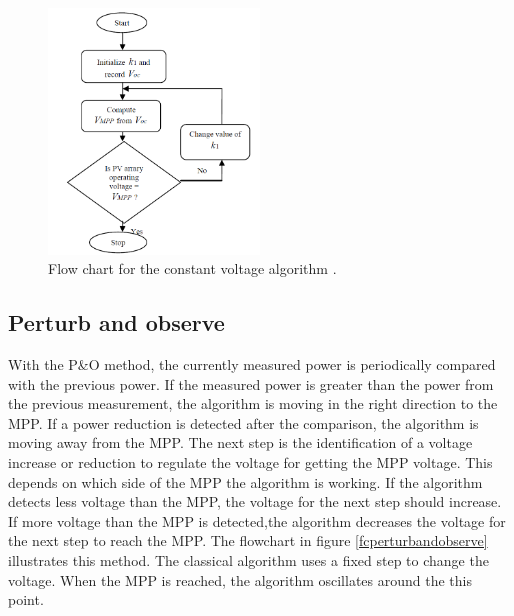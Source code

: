 \begin{figure}[H]
	\begin{center}
		\includegraphics[width=0.5\textwidth]{../Pictures/P1/Flow_chart/Flow_chart_constant_voltage}
		\caption{Flow chart for the constant voltage algorithm \cite{flowchartVC}. }
		\label{fcconstantvoltage}
	\end{center}	
\end{figure}
 

\subsection{Perturb and observe}
With the P\&O method, the currently measured power is periodically compared with the previous power. If the measured power is greater than the power from the previous measurement, the algorithm is moving in the right direction to the MPP. If a power reduction is detected after the comparison, the algorithm is moving away from the MPP. The next step is the identification of a voltage increase or reduction to regulate the voltage for getting the MPP voltage. This depends on which side of the MPP the algorithm is working. If the algorithm detects less voltage than the MPP, the voltage for the next step should increase. If more voltage than the MPP is detected,the algorithm decreases the voltage for the next step to reach the MPP.
The flowchart in figure \ref{fcperturbandobserve} illustrates this method. The classical algorithm uses a fixed step to change the voltage. When the MPP is reached, the algorithm oscillates around the this point. \cite{flowchartVC}

